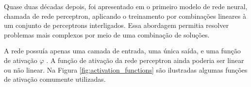             \begin{figure}[ht]
            \end{figure}
            
            Quase duas décadas depois, foi apresentado em \cite{rede1} o primeiro modelo de rede neural, chamada de rede perceptron, aplicando o treinamento por combinações lineares à um conjunto de perceptrons interligados. Essa abordagem permitia resolver problemas mais complexos por meio de uma combinação de soluções. 
              
            A rede possuía apenas uma camada de entrada, uma única saída, e uma função de ativação  $ \varphi $ \cite{Haykin1994}. A função de ativação da rede perceptron ainda poderia ser linear ou não linear. Na Figura \ref{fig:activation_functions} são ilustradas algumas funções de ativação comumente utilizadas. 
            
             \begin{figure}[ht]
            \end{figure}
            
